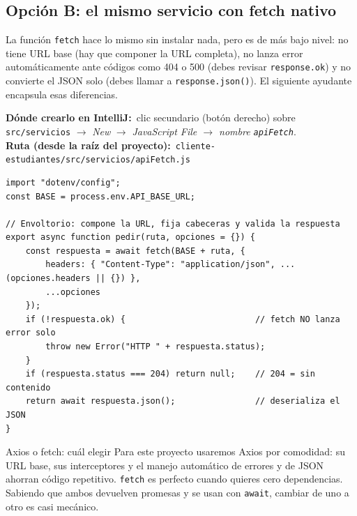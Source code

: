 \documentclass[11pt]{article}
\newcommand{\dondecrear}[3]{\begin{ubic}{\footnotesize\textbf{\color{ndverdeo}D\'onde crearlo en IntelliJ:}~clic secundario (bot\'on derecho) sobre \texttt{#1} $\rightarrow$ \emph{New} $\rightarrow$ \emph{#2}.\\[2pt]\textbf{\color{ndverdeo}Ruta (desde la ra\'iz del proyecto):}~\texttt{#3}}\end{ubic}\nobreak\vspace{3pt}}
\begin{document}
\subsection{Opción B: el mismo servicio con fetch nativo}
La función \texttt{fetch} hace lo mismo sin instalar nada, pero es de más bajo nivel: no tiene URL base (hay que componer la URL completa), no lanza error automáticamente ante códigos como 404 o 500 (debes revisar \texttt{response.\allowbreak{}ok}) y no convierte el JSON solo (debes llamar a \texttt{response.\allowbreak{}json()}). El siguiente ayudante encapsula esas diferencias.

\dondecrear{src/servicios}{JavaScript File $\rightarrow$ nombre \texttt{apiFetch}}{cliente-estudiantes/src/servicios/apiFetch.js}
\begin{cajacodigo}
\begin{lstlisting}[style=js]
import "dotenv/config";
const BASE = process.env.API_BASE_URL;

// Envoltorio: compone la URL, fija cabeceras y valida la respuesta
export async function pedir(ruta, opciones = {}) {
	const respuesta = await fetch(BASE + ruta, {
		headers: { "Content-Type": "application/json", ...(opciones.headers || {}) },
		...opciones
	});
	if (!respuesta.ok) {                          // fetch NO lanza error solo
		throw new Error("HTTP " + respuesta.status);
	}
	if (respuesta.status === 204) return null;    // 204 = sin contenido
	return await respuesta.json();                // deserializa el JSON
}
\end{lstlisting}
\end{cajacodigo}
\vspace{2pt}
\begin{cajatip}{Axios o fetch: cuál elegir}
Para este proyecto usaremos Axios por comodidad: su URL base, sus interceptores y el manejo automático de errores y de JSON ahorran código repetitivo. \texttt{fetch} es perfecto cuando quieres cero dependencias. Sabiendo que ambos devuelven promesas y se usan con \texttt{await}, cambiar de uno a otro es casi mecánico.\par
\end{cajatip}
\end{document}
